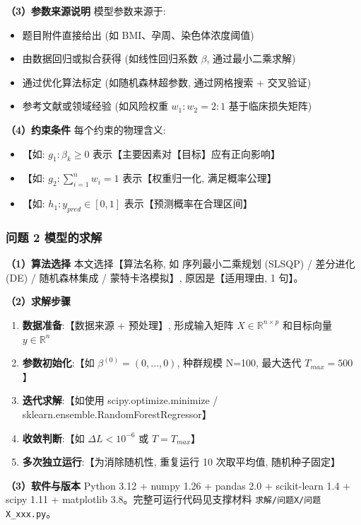 \textbf{（3）参数来源说明} \quad 模型参数来源于:
\begin{itemize}
  \item 题目附件直接给出 (如 BMI、孕周、染色体浓度阈值)
  \item 由数据回归或拟合获得 (如线性回归系数 $\beta$, 通过最小二乘求解)
  \item 通过优化算法标定 (如随机森林超参数, 通过网格搜索 + 交叉验证)
  \item 参考文献或领域经验 (如风险权重 $w_1:w_2 = 2:1$ 基于临床损失矩阵)
\end{itemize}

\textbf{（4）约束条件} \quad 每个约束的物理含义:
\begin{itemize}
  \item 【如: $g_1: \beta_k \geq 0$ 表示【主要因素对【目标】应有正向影响】
  \item 【如: $g_2: \sum_{i=1}^{n} w_i = 1$ 表示【权重归一化, 满足概率公理】
  \item 【如: $h_1: y_{pred} \in [0,1]$ 表示【预测概率在合理区间】
\end{itemize}

\subsubsection{问题 2 模型的求解}

\textbf{（1）算法选择} \quad 本文选择【算法名称, 如 序列最小二乘规划 (SLSQP) / 差分进化 (DE) / 随机森林集成 / 蒙特卡洛模拟】, 原因是【适用理由, 1 句】。

\textbf{（2）求解步骤}
\begin{enumerate}
  \item \textbf{数据准备}:【数据来源 + 预处理】, 形成输入矩阵 $X \in \mathbb{R}^{n \times p}$ 和目标向量 $y \in \mathbb{R}^n$
  \item \textbf{参数初始化}:【如 $\beta^{(0)} = (0,\ldots,0)$, 种群规模 N=100, 最大迭代 $T_{max}=500$】
  \item \textbf{迭代求解}:【如使用 scipy.optimize.minimize / sklearn.ensemble.RandomForestRegressor】
  \item \textbf{收敛判断}:【如 $\Delta L < 10^{-6}$ 或 $T = T_{max}$】
  \item \textbf{多次独立运行}:【为消除随机性, 重复运行 10 次取平均值, 随机种子固定】
\end{enumerate}

\textbf{（3）软件与版本} \quad Python 3.12 + numpy 1.26 + pandas 2.0 + scikit-learn 1.4 + scipy 1.11 + matplotlib 3.8。完整可运行代码见支撑材料 \texttt{求解/问题X/问题X\_xxx.py}。

